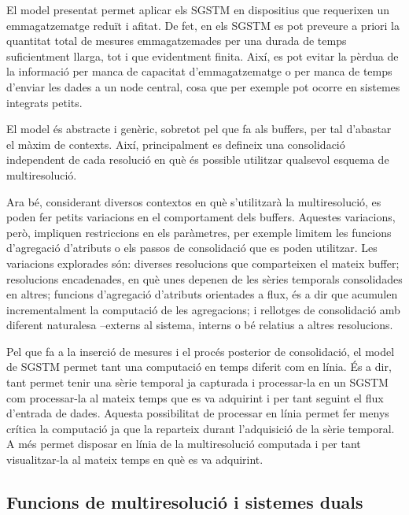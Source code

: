 El model presentat permet aplicar els \gls{SGSTM} en dispositius que
requerixen un emmagatzematge reduït i afitat. De fet, en els
\gls{SGSTM} es pot preveure a priori la quantitat total de mesures
emmagatzemades per una durada de temps suficientment llarga, tot i que
evidentment finita. Així, es pot evitar la pèrdua de la informació per
manca de capacitat d'emmagatzematge o per manca de temps d'enviar les
dades a un node central, cosa que per exemple pot ocorre en sistemes
integrats petits. 


El model és abstracte i genèric, sobretot pel que fa als buffers, per
tal d'abastar el màxim de contexts. Així, principalment es defineix
una consolidació independent de cada resolució en què és possible
utilitzar qualsevol esquema de multiresolució.



Ara bé, considerant diversos contextos en què s'utilitzarà la
multiresolució, es poden fer petits variacions en el comportament dels
buffers. Aquestes variacions, però, impliquen restriccions en els
paràmetres, per exemple limitem les funcions d'agregació d'atributs o
els passos de consolidació que es poden utilitzar.  Les variacions
explorades són: diverses resolucions que comparteixen el mateix
buffer; resolucions encadenades, en què unes depenen de les sèries
temporals consolidades en altres; funcions d'agregació d'atributs
orientades a flux, és a dir que acumulen incrementalment la computació
de les agregacions; i rellotges de consolidació amb diferent
naturalesa --externs al sistema, interns o bé relatius a altres
resolucions.




Pel que fa a la inserció de mesures i el procés posterior de
consolidació, el model de \gls{SGSTM} permet tant una computació en
temps diferit com en línia. És a dir, tant permet tenir una sèrie
temporal ja capturada i processar-la en un \gls{SGSTM} com
processar-la al mateix temps que es va adquirint i per tant seguint el
flux d'entrada de dades.  Aquesta possibilitat de processar en línia
permet fer menys crítica la computació ja que la reparteix durant
l'adquisició de la sèrie temporal. A més permet disposar en línia de
la multiresolució computada i per tant visualitzar-la al mateix temps
en què es va adquirint.






\subsection{Funcions de multiresolució i sistemes duals}


